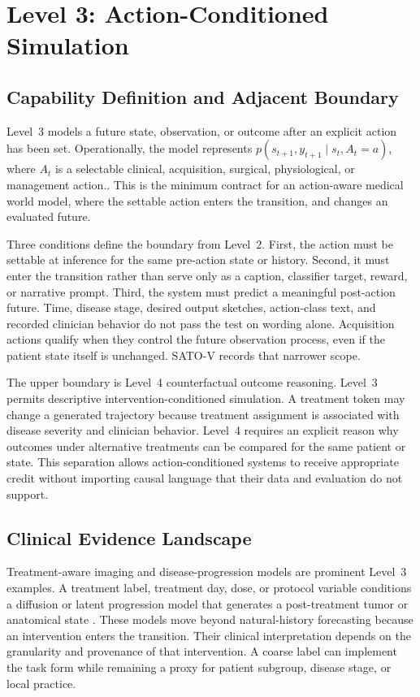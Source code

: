 \section{Level 3: Action-Conditioned Simulation}
\label{sec:level3}

\subsection{Capability Definition and Adjacent Boundary}

Level~3 models a future state, observation, or outcome after an explicit action has been set. Operationally, the model represents $p(s_{t+1},y_{t+1}\mid s_t,A_t{=}a)$, where
$A_t$ is a selectable clinical, acquisition, surgical, physiological, or management action.. This is the minimum contract for an action-aware medical world model, where the settable action enters the transition, and changes an evaluated future.

Three conditions define the boundary from Level~2. First, the action must be settable at inference for the same pre-action state or history. Second, it must enter the transition rather than serve only as a caption, classifier target, reward, or narrative prompt. Third, the system must predict a meaningful post-action future. Time, disease stage, desired output sketches, action-class text, and recorded clinician behavior do not pass the test on wording alone. Acquisition actions qualify when they control the future observation process, even if the patient state itself is unchanged. SATO-V records that narrower scope.

The upper boundary is Level~4 counterfactual outcome reasoning. Level~3 permits descriptive intervention-conditioned simulation. A treatment token may change a generated trajectory because treatment assignment is associated with disease severity and clinician behavior. Level~4 requires an explicit reason why outcomes under alternative treatments can be compared for the same patient or state. This separation allows action-conditioned systems to receive appropriate credit without importing causal language that their data and evaluation do not support.

\subsection{Clinical Evidence Landscape}

Treatment-aware imaging and disease-progression models are prominent Level~3 examples. A treatment label, treatment day, dose, or protocol variable conditions a diffusion or latent progression model that generates a post-treatment tumor or anatomical state \citep{yang2025medical,liu2019novel}. These models move beyond natural-history forecasting because an intervention enters the transition. Their clinical interpretation depends on the granularity and provenance of that intervention. A coarse label can implement the task form while remaining a proxy for patient subgroup, disease stage, or local practice.

